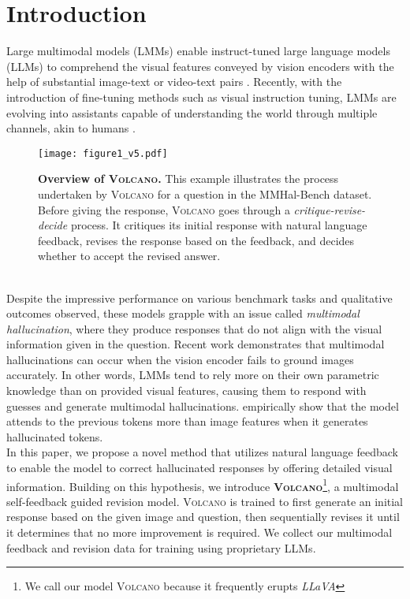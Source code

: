 \documentclass[11pt]{article}
\newcommand{\Ours}{\textsc{Volcano}}
\begin{document}
\section{Introduction}
\label{sec:intro}
Large multimodal models (LMMs) enable instruct-tuned large language models (LLMs) to comprehend the visual features conveyed by vision encoders with the help of substantial image-text or video-text pairs \citep{alayrac2022flamingo, liu2023improved, liu2023visual, chen2023shikra, peng2023kosmos2, dai2023instructblip, zhu2023minigpt4, ye2023mplugowl, li2023otter, zhang2023llamaadapter, su2023pandagpt, maaz2023videochatgpt}. Recently, with the introduction of fine-tuning methods such as visual instruction tuning, LMMs are evolving into assistants capable of understanding the world through multiple channels, akin to humans \citep{liu2023improved, liu2023visual}.\begin{figure}[t!]
\texttt{[image: figure1\_v5.pdf]}
\caption{\textbf{Overview of {\Ours}.} This example illustrates the process undertaken by {\Ours} for a question in the MMHal-Bench dataset. Before giving the response, {\Ours} goes through a \textit{critique-revise-decide} process. It critiques its initial response with natural language feedback, revises the response based on the feedback, and decides whether to accept the revised answer.}
\label{fig:figure1}
\end{figure} \\
Despite the impressive performance on various benchmark tasks and qualitative outcomes observed, these models grapple with an issue called \textit{multimodal hallucination}, where they produce responses that do not align with the visual information given in the question.
Recent work \citep{zhai2023halleswitch} demonstrates that multimodal hallucinations can occur when the vision encoder fails to ground images accurately. In other words, LMMs tend to rely more on their own parametric knowledge than on provided visual features, causing them to respond with guesses and generate multimodal hallucinations. \citet{wang2023evaluation} empirically show that the model attends to the previous tokens more than image features when it generates hallucinated tokens. \\
In this paper, we propose a novel method that utilizes natural language feedback to enable the model to correct hallucinated responses by offering detailed visual information. Building on this hypothesis, we introduce \textbf{{\Ours}}\footnote{We call our model {\Ours} because it frequently erupts \textit{LLaVA}}, a multimodal self-feedback guided revision model. {\Ours} is trained to first generate an initial response based on the given image and question, then sequentially revises it until it determines that no more improvement is required. We collect our multimodal feedback and revision data for training using proprietary LLMs. \\
\end{document}

